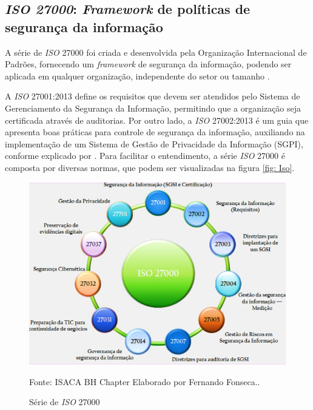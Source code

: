 \documentclass[
	12pt,				%
	openright,			%
	oneside,			%
	a4paper,			%
	english,			%
	french,				%
	spanish,			%
	brazil,				%
	]{abntex2}
\begin{document}
\subsection{\textit{ISO 27000}: \textit{Framework} de políticas de segurança da informação}

A série de \textit{ISO} 27000 foi criada e desenvolvida pela Organização Internacional de Padrões, fornecendo um \textit{framework} de segurança da informação, podendo ser aplicada em qualquer organização, independente do setor ou tamanho \cite{Pohlmann2019}.

A \textit{ISO} 27001:2013 define os requisitos que devem ser atendidos pelo Sistema de Gerenciamento da Segurança da Informação, permitindo que a organização seja certificada através de auditorias. Por outro lado, a \textit{ISO} 27002:2013 é um guia que apresenta boas práticas para controle de segurança da informação, auxiliando na implementação de um Sistema de Gestão de Privacidade da Informação (SGPI), conforme explicado por \cite{Jimene2020}. Para facilitar o entendimento, a série \textit{ISO} 27000 é composta por diversas normas, que podem ser visualizadas na figura \ref{fig: Iso}.

\begin{figure}[ht]
    \centering
    \caption{Série de \textit{ISO} 27000}
    \includegraphics[width=6.0in]{Images/03ISO.jpeg}
    
    \label{fig: Iso }
    \centering \small Fonte: ISACA BH Chapter Elaborado por Fernando Fonseca..
\end{figure}

\end{document}
